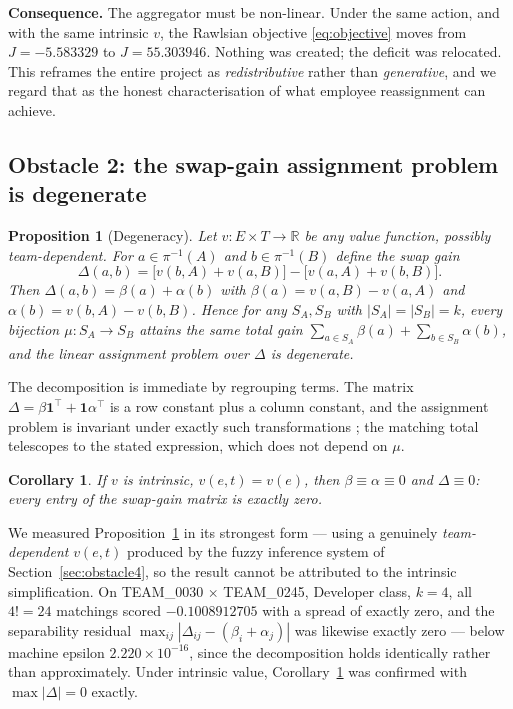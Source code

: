 \documentclass[conference]{IEEEtran}
\newtheorem{proposition}{Proposition}
\newtheorem{corollary}{Corollary}
\newcommand{\vv}{v}
\newcommand{\R}{\mathbb{R}}
\begin{document}
\noindent\textbf{Consequence.} The aggregator must be non-linear. Under the same
action, and with the same intrinsic $\vv$, the Rawlsian objective
\eqref{eq:objective} moves from $J=-5.583329$ to $J=55.303946$. Nothing was
created; the deficit was relocated. This reframes the entire project as
\emph{redistributive} rather than \emph{generative}, and we regard that as the
honest characterisation of what employee reassignment can achieve.

\subsection{Obstacle 2: the swap-gain assignment problem is degenerate}

\begin{proposition}[Degeneracy]\label{prop:degeneracy}
Let $\vv:E\times T\to\R$ be \emph{any} value function, possibly team-dependent.
For $a\in \pi^{-1}(A)$ and $b\in\pi^{-1}(B)$ define the swap gain
\[
\Delta(a,b)=\big[\vv(b,A)+\vv(a,B)\big]-\big[\vv(a,A)+\vv(b,B)\big].
\]
Then $\Delta(a,b)=\beta(a)+\alpha(b)$ with
$\beta(a)=\vv(a,B)-\vv(a,A)$ and $\alpha(b)=\vv(b,A)-\vv(b,B)$. Hence for any
$S_A, S_B$ with $|S_A|=|S_B|=k$, every bijection $\mu:S_A\to S_B$ attains the
same total gain
$\sum_{a\in S_A}\beta(a)+\sum_{b\in S_B}\alpha(b)$,
and the linear assignment problem over $\Delta$ is degenerate.
\end{proposition}

\begin{IEEEproof}
The decomposition is immediate by regrouping terms. The matrix
$\Delta = \beta\mathbf{1}^\top + \mathbf{1}\alpha^\top$ is a row constant plus a
column constant, and the assignment problem is invariant under exactly such
transformations \cite{burkard2009}; the matching total telescopes to the stated
expression, which does not depend on $\mu$.
\end{IEEEproof}

\begin{corollary}\label{cor:intrinsic}
If $\vv$ is intrinsic, $\vv(e,t)=\vv(e)$, then $\beta\equiv\alpha\equiv 0$ and
$\Delta\equiv 0$: every entry of the swap-gain matrix is exactly zero.
\end{corollary}

We measured Proposition~\ref{prop:degeneracy} in its strongest form --- using a
genuinely \emph{team-dependent} $\vv(e,t)$ produced by the fuzzy inference system
of Section~\ref{sec:obstacle4}, so the result cannot be attributed to the
intrinsic simplification. On TEAM\_0030 $\times$ TEAM\_0245, Developer class,
$k=4$, all $4!=24$ matchings scored $-0.1008912705$ with a spread of exactly
zero, and the separability residual
$\max_{ij}|\Delta_{ij}-(\beta_i+\alpha_j)|$ was likewise exactly zero --- below
machine epsilon $2.220\times10^{-16}$, since the decomposition holds identically
rather than approximately. Under intrinsic value,
Corollary~\ref{cor:intrinsic} was confirmed with $\max|\Delta| = 0$ exactly.
\end{document}

